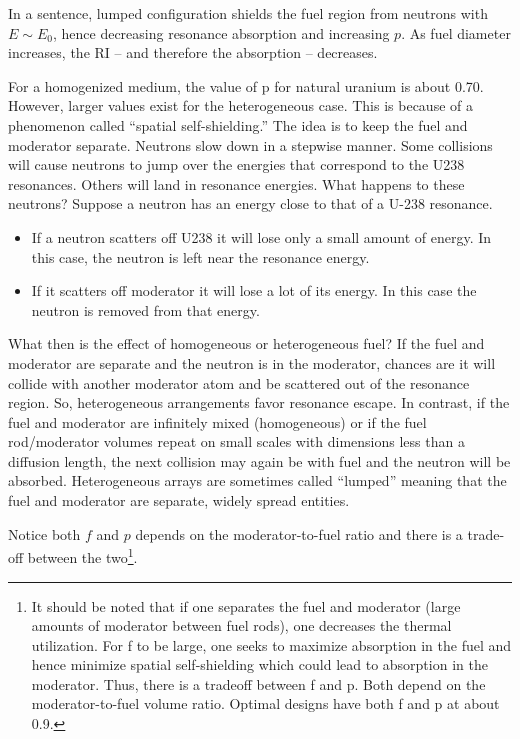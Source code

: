 \documentclass{school-22.211-notes}
\begin{document}
In a sentence, lumped configuration shields the fuel region from neutrons with $E \sim E_0$, hence decreasing resonance absorption and increasing $p$. As fuel diameter increases, the RI -- and therefore the absorption -- decreases. 

For a homogenized medium, the value of p for natural uranium is about 0.70.
However, larger values exist for the heterogeneous case. This is because of a
phenomenon called ``spatial self-shielding.'' The idea is to keep the fuel and
moderator separate. Neutrons slow down in a stepwise manner. Some collisions
will cause neutrons to jump over the energies that correspond to the U238
resonances. Others will land in resonance energies. What happens to these neutrons? 
Suppose a neutron has an energy close to that of a U-238 resonance. 
\begin{itemize}
\item If a neutron scatters off U238 it will lose
only a small amount of energy. In this case, the neutron is
left near the resonance energy.
\item If it scatters off moderator it will lose a lot of its energy.  In this case the neutron is removed from that energy.
\end{itemize}

What then is the effect of homogeneous or heterogeneous fuel? If the fuel and
moderator are separate and the neutron is in the moderator, chances are it will
collide with another moderator atom and be scattered out of the resonance region.
So, heterogeneous arrangements favor resonance escape. In contrast, if the fuel
and moderator are infinitely mixed (homogeneous) or if the fuel rod/moderator
volumes repeat on small scales with dimensions less than a diffusion length, the
next collision may again be with fuel and the neutron will be absorbed.
Heterogeneous arrays are sometimes called ``lumped'' meaning that the fuel and
moderator are separate, widely spread entities.

Notice both $f$ and $p$ depends on the moderator-to-fuel ratio and there is a trade-off
between the two\footnote{It should be noted that if one separates the fuel and moderator (large amounts of
moderator between fuel rods), one decreases the thermal utilization. For f to be
large, one seeks to maximize absorption in the fuel and hence minimize spatial
self-shielding which could lead to absorption in the moderator. Thus, there is a
tradeoff between f and p. Both depend on the moderator-to-fuel volume ratio.
Optimal designs have both f and p at about 0.9.}. 
\end{document}
